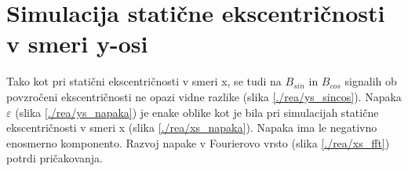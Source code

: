\section{Simulacija statične ekscentričnosti v smeri y-osi}
Tako kot pri statični ekscentričnosti v smeri x, se tudi na $B_{sin}$ in $B_{cos}$ signalih ob povzročeni ekscentričnosti ne opazi vidne razlike (slika \ref{./rea/ys_sincos}). Napaka $\varepsilon$ (slika \ref{./rea/ys_napaka}) je enake oblike kot je bila pri simulacijah statične ekscentričnosti v smeri x (slika \ref{./rea/xs_napaka}). Napaka ima le negativno enosmerno komponento. Razvoj napake v Fourierovo vrsto (slika \ref{./rea/xs_fft}) potrdi pričakovanja.
\newpage
